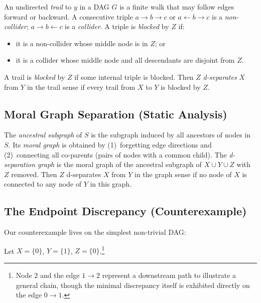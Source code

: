 \documentclass[acmsmall,screen,review,anonymous,nonacm]{acmart}
\begin{document}
An undirected \emph{trail} to $y$ in a DAG $G$ is a finite walk that may
follow edges forward or backward.  A consecutive triple $a \to b \to c$ or
$a \leftarrow b \to c$ is a \emph{non-collider}; $a \to b \leftarrow c$ is a
\emph{collider}.  A triple is \emph{blocked} by $Z$ if:
\begin{itemize}
  \item it is a non-collider whose middle node is in $Z$; or
  \item it is a collider whose middle node and all descendants are disjoint from $Z$.
\end{itemize}
A trail is \emph{blocked} by $Z$ if some internal triple is blocked.  Then $Z$
\emph{d-separates} $X$ from $Y$ in the trail sense if every trail from $X$ to $Y$
is blocked by $Z$.

\subsection{Moral Graph Separation (Static Analysis)}

The \emph{ancestral subgraph} of $S$ is the subgraph induced by all ancestors of
nodes in $S$.  Its \emph{moral graph} is obtained by (1)~forgetting edge
directions and (2)~connecting all co-parents (pairs of nodes with a common child).
The \emph{d-separation graph} is the moral graph of the ancestral subgraph of
$X \cup Y \cup Z$ with $Z$ removed.  Then $Z$ d-separates $X$ from $Y$ in the
graph sense if no node of $X$ is connected to any node of $Y$ in this graph.

\subsection{The Endpoint Discrepancy (Counterexample)}\label{sec:counterexample}

Our counterexample lives on the simplest non-trivial DAG:

\begin{center}
\end{center}

Let $X = \{0\}$, $Y = \{1\}$, $Z = \{0\}$.\footnote{Node $2$ and the edge $1 \to 2$ represent a downstream path to illustrate a general chain, though the minimal discrepancy itself is exhibited directly on the edge $0 \to 1$.}
\end{document}
